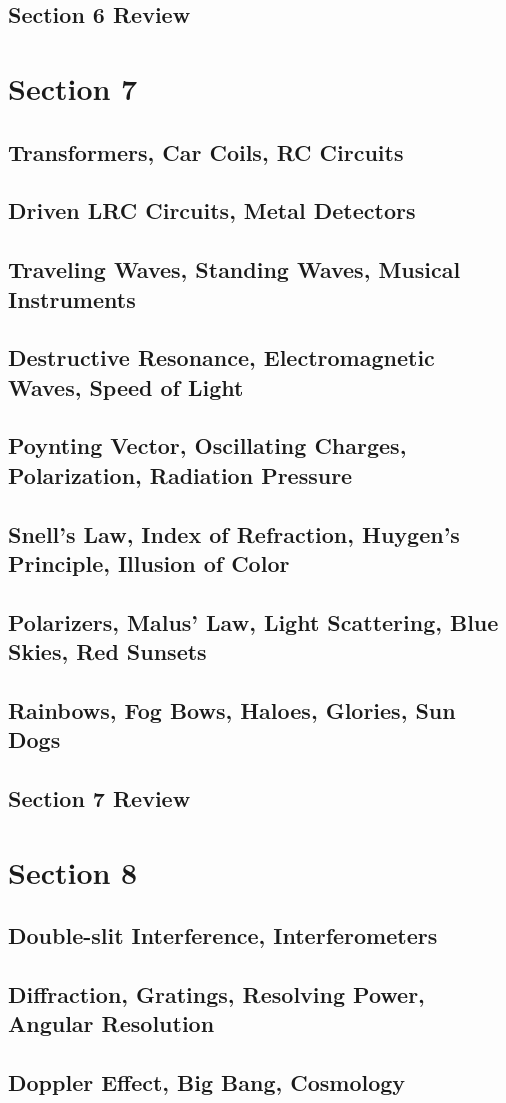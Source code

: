 \documentclass[../introphysics.tex]{subfiles}
\begin{document}
\section{Section 6 Review}
\chapter{Section 7}
\section{Transformers, Car Coils, RC Circuits}
\section{Driven LRC Circuits, Metal Detectors}
\section{Traveling Waves, Standing Waves, Musical Instruments}
\section{Destructive Resonance, Electromagnetic Waves, Speed of Light}
\section{Poynting Vector, Oscillating Charges, Polarization, Radiation Pressure}
\section{Snell's Law, Index of Refraction, Huygen's Principle, Illusion of Color}
\section{Polarizers, Malus' Law, Light Scattering, Blue Skies, Red Sunsets}
\section{Rainbows, Fog Bows, Haloes, Glories, Sun Dogs}
\section{Section 7 Review}
\chapter{Section 8}
\section{Double-slit Interference, Interferometers}
\section{Diffraction, Gratings, Resolving Power, Angular Resolution}
\section{Doppler Effect, Big Bang, Cosmology}
\end{document}
